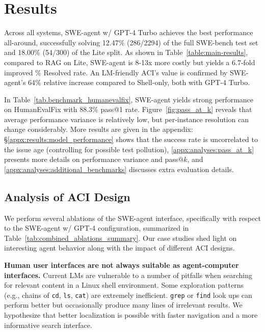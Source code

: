 \newcommand{\decrease}[1]{\textsubscript{\textcolor{red}{$\downarrow$ #1}}}



\section{Results}
\label{sec:results}
Across all systems, SWE-agent w/ GPT-4 Turbo achieves the best performance all-around, successfully solving \num{12.47}\% (\num{286}/\num{2294}) of the full SWE-bench test set and \num{18.00}\% (\num{54}/\num{300}) of the Lite split.
As shown in Table~\ref{table:main-results}, compared to RAG on Lite, SWE-agent is \num{8}-\num{13}x more costly but yields a \num{6.7}-fold improved \% Resolved rate.
An LM-friendly ACI's value is confirmed by SWE-agent's \num{64}\% relative increase compared to Shell-only, both with GPT-4 Turbo.

In Table~\ref{tab.benchmark_humanevalfix}, SWE-agent yields strong performance on HumanEvalFix with \num{88.3}\% pass@1 rate.
Figure~\ref{fig:pass_at_k} reveals that average performance variance is relatively low, but per-instance resolution can change considerably.
More results are given in the appendix: \S\ref{appx:results:model_performance} shows that the success rate is uncorrelated to the issue age (controlling for possible test pollution), \ref{appx:analyses:pass_at_k} presents more details on performance variance and pass$@k$, and \ref{appx:analyses:additional_benchmarks} discusses extra evaluation details.

\subsection{Analysis of ACI Design}
\label{sec:analysis:interface-design}
We perform several ablations of the SWE-agent interface, specifically with respect to the SWE-agent w/ GPT-4 configuration, summarized in Table~\ref{tab:combined_ablations_summary}.
Our case studies shed light on interesting agent behavior along with the impact of different ACI designs.

\textbf{Human user interfaces are not always suitable as agent-computer interfaces.}
Current LMs are vulnerable to a number of pitfalls when searching for relevant content in a Linux shell environment.
Some exploration patterns (e.g., chains of \texttt{cd}, \texttt{ls}, \texttt{cat}) are extremely inefficient.
\texttt{grep} or \texttt{find} look ups can perform better but occasionally produce many lines of irrelevant results.
We hypothesize that better localization is possible with faster navigation and a more informative search interface. 


